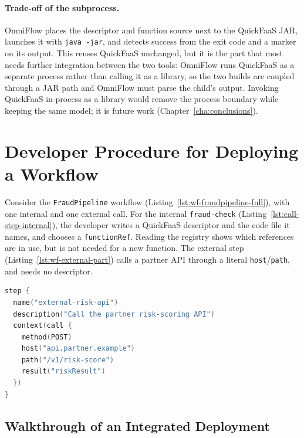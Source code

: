 \paragraph{Trade-off of the subprocess.}
OmniFlow places the descriptor and function source next to the QuickFaaS JAR, launches it with
\texttt{java\ -jar}, and detects success from the exit code and a marker on its output. This reuses
QuickFaaS unchanged, but it is the part that most needs further integration between the two tools:
OmniFlow runs QuickFaaS as a separate process rather than calling it as a library, so the two builds
are coupled through a JAR path and OmniFlow must parse the child's output. Invoking QuickFaaS
in-process as a library would remove the process boundary while keeping the same model; it is
future work (Chapter~\ref{cha:conclusions}).

\section{Developer Procedure for Deploying a Workflow}
\label{sec:developer-workflow}

Consider the \texttt{FraudPipeline} workflow (Listing~\ref{lst:wf-fraudpipeline-full}), with one
internal and one external call. For the internal \texttt{fraud-check}
(Listing~\ref{lst:call-step-internal}), the developer writes a QuickFaaS descriptor and the code file
it names, and chooses a \texttt{functionRef}. Reading the registry shows which references are in
use, but is not needed for a new function. The external step (Listing~\ref{lst:wf-external-part})
calls a partner API through a literal \texttt{host}/\texttt{path}, and needs no descriptor.

\begin{lstlisting}[language=Kotlin,caption={External call of the \texttt{FraudPipeline} workflow (excerpt of Listing~\ref{lst:wf-fraudpipeline-full}).},label={lst:wf-external-part},basicstyle=\ttfamily\small,breaklines=false]
step {
  name("external-risk-api")
  description("Call the partner risk-scoring API")
  context(call {
    method(POST)
    host("api.partner.example")
    path("/v1/risk-score")
    result("riskResult")
  })
}
\end{lstlisting}

\subsection{Walkthrough of an Integrated Deployment}
\label{sec:walkthrough}

